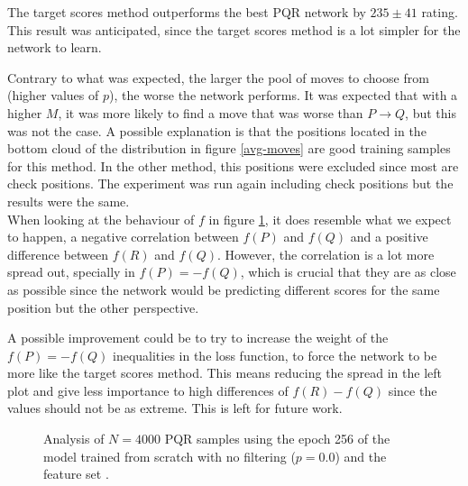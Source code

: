 The target scores method outperforms the best PQR network by $235 \pm 41$ rating. This result was anticipated, since the target scores method is a lot simpler for the network to learn.

Contrary to what was expected, the larger the pool of moves to choose from (higher values of $p$), the worse the network performs. It was expected that with a higher $M$, it was more likely to find a move that was worse than $P \rightarrow Q$, but this was not the case. A possible explanation is that the positions located in the bottom cloud of the distribution in figure \ref{avg-moves} are good training samples for this method. In the other method, this positions were excluded since most are check positions. The experiment was run again including check positions but the results were the same. \\

\newpage
When looking at the behaviour of $f$ in figure \ref{pqr-scratch}, it does resemble what we expect to happen, a negative correlation between $f(P)$ and $f(Q)$ and a positive difference between $f(R)$ and $f(Q)$. However, the correlation is a lot more spread out, specially in \mbox{$f(P)=-f(Q)$}, which is crucial that they are as close as possible since the network would be predicting different scores for the same position but the other perspective.

A possible improvement could be to try to increase the weight of the \mbox{$f(P)=-f(Q)$} inequalities in the loss function, to force the network to be more like the target scores method. This means reducing the spread in the left plot and give less importance to high differences of \mbox{$f(R)-f(Q)$} since the values should not be as extreme. This is left for future work.

\begin{figure}[H]
\centering
{}
\caption{Analysis of $N=4000$ PQR samples using the epoch 256 of the model trained from scratch with no filtering ($p=0.0$) and the feature set .}
\label{pqr-scratch}
\end{figure}

